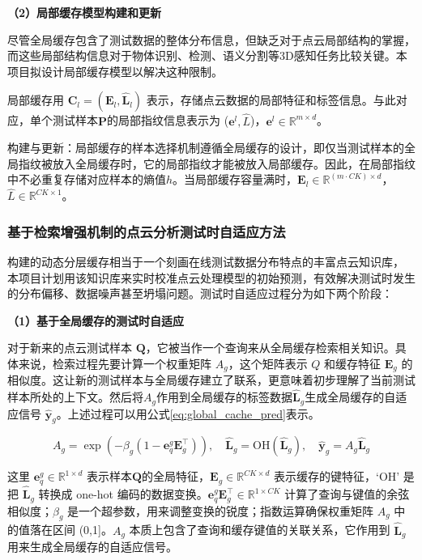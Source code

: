\documentclass[12pt]{article}
\newcommand{\myEmph}[1]{\textbf{\textcolor[rgb]{0,0,0.25}{#1}}}
\begin{document}
\myEmph{（2）局部缓存模型构建和更新}

尽管全局缓存包含了测试数据的整体分布信息，但缺乏对于点云局部结构的掌握，而这些局部结构信息对于物体识别、检测、语义分割等3D感知任务比较关键。本项目拟设计局部缓存模型以解决这种限制。

局部缓存用 $\textbf{C}_l = (\textbf{E}_l, \hat{\textbf{L}}_l)$ 表示，存储点云数据的局部特征和标签信息。与此对应，单个测试样本$\boldsymbol{P}$的局部指纹信息表示为 ($\textbf{e}^l, \hat{L}$)，$\textbf{e}^l \in \mathbb{R}^{m\times d}$。

构建与更新：局部缓存的样本选择机制遵循全局缓存的设计，即仅当测试样本的全局指纹被放入全局缓存时，它的局部指纹才能被放入局部缓存。因此，在局部指纹中不必重复存储对应样本的熵值$h$。当局部缓存容量满时，$\textbf{E}_l \in \mathbb{R}^{(m\cdot C K)\times d}$，$\hat{L} \in \mathbb{R}^{CK \times 1}$。

\subsubsection{基于检索增强机制的点云分析测试时自适应方法}

构建的动态分层缓存相当于一个刻画在线测试数据分布特点的丰富点云知识库，
本项目计划用该知识库来实时校准点云处理模型的初始预测，有效解决测试时发生的分布偏移、数据噪声甚至坍塌问题。测试时自适应过程分为如下两个阶段：

\myEmph{（1）基于全局缓存的测试时自适应}

对于新来的点云测试样本 $\boldsymbol{Q}$，它被当作一个查询来从全局缓存检索相关知识。具体来说，检索过程先要计算一个权重矩阵 $A_g$，这个矩阵表示 $Q$ 和缓存特征 $\textbf{E}_g$ 的相似度。这让新的测试样本与全局缓存建立了联系，更意味着初步理解了当前测试样本所处的上下文。然后将$A_g$作用到全局缓存的标签数据$\hat{\textbf{L}}_{g}$生成全局缓存的自适应信号 $\hat{\textbf{y}}_g$。上述过程可以用公式\ref{eq:global_cache_pred}表示。

\begin{equation}
    A_g = \exp(-\beta_g(1 - \textbf{e}_q^g \textbf{E}_{g}^\top)),\quad \hat{\textbf{L}}_{g} = \textrm{OH}(\hat{\textbf{L}}_{g}),\quad \hat{\textbf{y}}_g =  A_{g} \hat{\textbf{L}}_{g}
    \label{eq:global_cache_pred}
\end{equation}

这里 $\textbf{e}_q^g \in \mathbb{R}^{1\times d}$ 表示样本$\boldsymbol{Q}$的全局特征，$\textbf{E}_{g} \in \mathbb{R}^{CK\times d}$ 表示缓存的键特征，`OH' 是把 $\hat{\textbf{L}}_{g}$ 转换成 one-hot 编码的数据变换。$\textbf{e}_q^g \textbf{E}_{g}^\top \in \mathbb{R}^{1\times CK}$ 计算了查询与键值的余弦相似度；$\beta_g$ 是一个超参数，用来调整变换的锐度；指数运算确保权重矩阵 $A_g$ 中的值落在区间 (0,1]。$A_g$ 本质上包含了查询和缓存键值的关联关系，它作用到 $\hat{\textbf{L}}_{g}$ 用来生成全局缓存的自适应信号。
\end{document}
